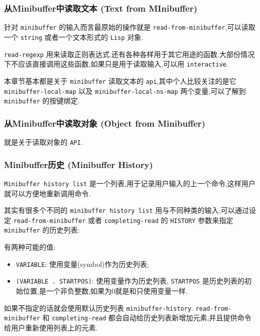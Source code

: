 \documentclass[11pt]{article}
\begin{document}
\subsubsection{从Minibuffer中读取文本 (Text from MInibuffer)}
\label{sec:org9e42925}

针对 \texttt{minibuffer} 的输入而言最原始的操作就是 \texttt{read-from-minibuffer},可以读取一个 \texttt{string} 或者一个文本形式的 \texttt{Lisp} 对象.

\texttt{read-regexp} 用来读取正则表达式.还有各种各样用于其它用途的函数.大部份情况下不应该直接调用这些函数,如果只是用于读取输入,可以用 \texttt{interactive}.

本章节基本都是关于 \texttt{minibuffer} 读取文本的 \texttt{api},其中个人比较关注的是它 \texttt{minibuffer-local-map} 以及 \texttt{minibuffer-local-ns-map} 两个变量,可以了解到 \texttt{minibuffer} 的按键绑定.


\subsubsection{从Minibuffer中读取对象 (Object from Minibuffer)}
\label{sec:org1e3890a}

就是关于读取对象的 \texttt{API}.


\subsubsection{Minibuffer历史 (Minibuffer History)}
\label{sec:orgbc82dab}

\texttt{Minibuffer history list} 是一个列表,用于记录用户输入的上一个命令,这样用户就可以方便地重新调用命令.

其实有很多个不同的 \texttt{minibuffer history list} 用与不同种类的输入,可以通过设定 \texttt{read-from-minibuffer} 或者 \texttt{completing-read} 的 \texttt{HISTORY} 参数来指定 \texttt{minibuffer} 的历史列表:

有两种可能的值:

\begin{itemize}
\item \texttt{VARIABLE}: 使用变量(symbol)作为历史列表;
\item \texttt{(VARIABLE . STARTPOS)}: 使用变量作为历史列表, \texttt{STARTPOS} 是历史列表的初始位置,是一个非负整数,如果为0就是和只使用变量一样.
\end{itemize}

如果不指定的话就会使用默认历史列表 \texttt{minibuffer-history}. \texttt{read-from-minibuffer} 和 \texttt{completing-read} 都会自动给历史列表新增加元素,并且提供命令给用户重新使用列表上的元素.
\end{document}
